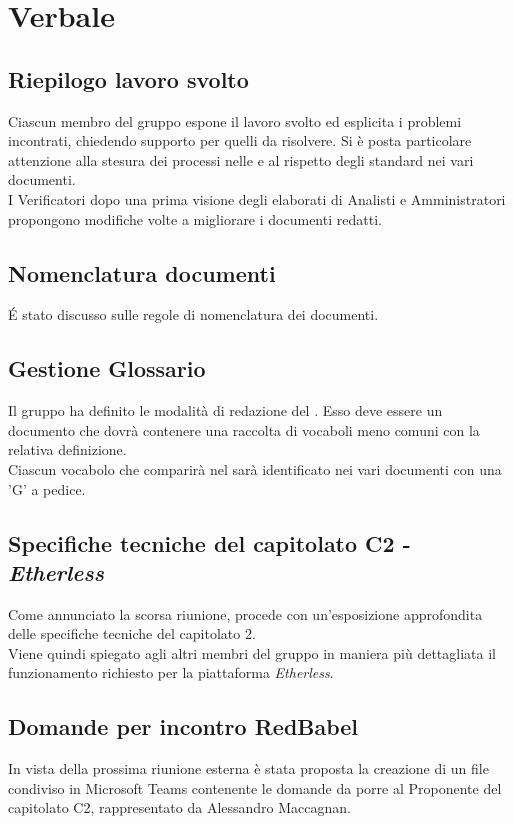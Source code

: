 \section{Verbale}
	
	\subsection{Riepilogo lavoro svolto}
		Ciascun membro del gruppo espone il lavoro svolto ed esplicita i problemi incontrati, chiedendo supporto per quelli da risolvere. Si è posta particolare attenzione alla stesura dei processi nelle \NdP{} e al rispetto degli standard nei vari documenti.\\
		I Verificatori dopo una prima visione degli elaborati di Analisti e Amministratori propongono modifiche volte a migliorare i documenti redatti.
		
		
	\subsection{Nomenclatura documenti}
		\'E stato discusso sulle regole di nomenclatura dei documenti.
		
		
	\subsection{Gestione Glossario}
		Il gruppo ha definito le modalità di redazione del \Glossario{}. Esso deve essere un documento che dovrà contenere una raccolta di vocaboli meno comuni con la relativa definizione.\\
		Ciascun vocabolo che comparirà nel \Glossario{} sarà identificato nei vari documenti con una ’G’ a pedice.


	\subsection{Specifiche tecniche del capitolato C2 - \textit{Etherless}}
		Come annunciato la scorsa riunione, \EG{} procede con un'esposizione approfondita delle specifiche tecniche del capitolato 2.\\
		Viene quindi spiegato agli altri membri del gruppo in maniera più dettagliata il funzionamento richiesto per la piattaforma 
		\textit{Etherless}. 
		
	
	\subsection{Domande per incontro RedBabel}
		In vista della prossima riunione esterna è stata proposta la creazione di un file condiviso in Microsoft Teams contenente le domande da porre al Proponente del capitolato C2, rappresentato da Alessandro Maccagnan.


